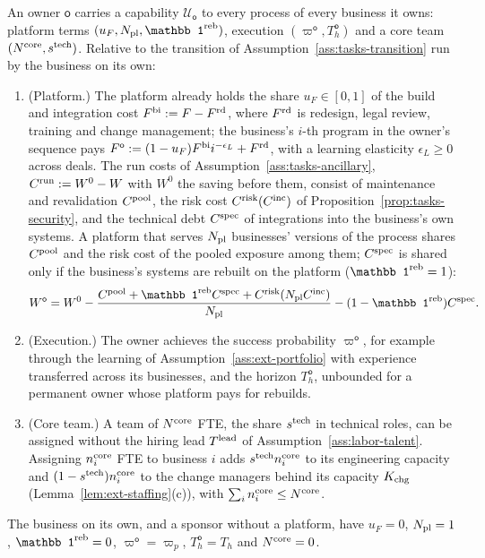 \begin{assumption}\label{ass:acq-owner}
An owner $\mathsf o$ carries a capability $\mathcal U_{\mathsf o}$ to every process of every business it owns: platform terms $(u_F,N_{\rm pl},\mathbb 1^{\rm reb})$, execution $(\varpi^{\mathsf o},T^{\mathsf o}_h)$ and a core team $(N^{\rm core},s^{\rm tech})$. Relative to the transition of Assumption~\ref{ass:tasks-transition} run by the business on its own:
\begin{enumerate}
\item[(i)] (Platform.) The platform already holds the share $u_F\in[0,1]$ of the build and integration cost $F^{\rm bi}:=F-F^{\rm rd}$, where $F^{\rm rd}$ is redesign, legal review, training and change management; the business's $i$-th program in the owner's sequence pays $F^{\mathsf o}:=(1-u_F)F^{\rm bi}i^{-\epsilon_L}+F^{\rm rd}$, with a learning elasticity $\epsilon_L\ge0$ across deals. The run costs of Assumption~\ref{ass:tasks-ancillary}, $C^{\rm run}:=W^0-W$ with $W^0$ the saving before them, consist of maintenance and revalidation $C^{\rm pool}$, the risk cost $C^{\rm risk}(C^{\rm inc})$ of Proposition~\ref{prop:tasks-security}, and the technical debt $C^{\rm spec}$ of integrations into the business's own systems. A platform that serves $N_{\rm pl}$ businesses' versions of the process shares $C^{\rm pool}$ and the risk cost of the pooled exposure among them; $C^{\rm spec}$ is shared only if the business's systems are rebuilt on the platform ($\mathbb 1^{\rm reb}=1$):
\begin{equation}\label{eq:acq-Wo}
W^{\mathsf o}=W^0-\frac{C^{\rm pool}+\mathbb 1^{\rm reb}C^{\rm spec}+C^{\rm risk}(N_{\rm pl}C^{\rm inc})}{N_{\rm pl}}-(1-\mathbb 1^{\rm reb})C^{\rm spec}.
\end{equation}
\item[(ii)] (Execution.) The owner achieves the success probability $\varpi^{\mathsf o}$, for example through the learning of Assumption~\ref{ass:ext-portfolio} with experience transferred across its businesses, and the horizon $T^{\mathsf o}_h$, unbounded for a permanent owner whose platform pays for rebuilds.
\item[(iii)] (Core team.) A team of $N^{\rm core}$ FTE, the share $s^{\rm tech}$ in technical roles, can be assigned without the hiring lead $T^{\rm lead}$ of Assumption~\ref{ass:labor-talent}. Assigning $n^{\rm core}_i$ FTE to business $i$ adds $s^{\rm tech}n^{\rm core}_i$ to its engineering capacity and $(1-s^{\rm tech})n^{\rm core}_i$ to the change managers behind its capacity $K_{\rm chg}$ (Lemma~\ref{lem:ext-staffing}(c)), with $\sum_in^{\rm core}_i\le N^{\rm core}$.
\end{enumerate}
The business on its own, and a sponsor without a platform, have $u_F=0$, $N_{\rm pl}=1$, $\mathbb 1^{\rm reb}=0$, $\varpi^{\mathsf o}=\varpi_p$, $T^{\mathsf o}_h=T_h$ and $N^{\rm core}=0$.
\end{assumption}

